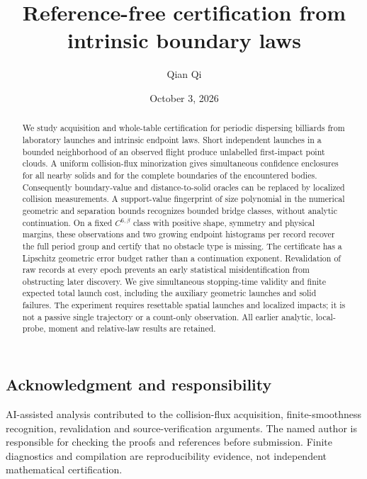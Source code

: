 \documentclass[11pt]{amsart}
\title[Reference-free certification]{Reference-free certification from intrinsic boundary laws}
\author{Qian Qi}\date{October 3, 2026}
\theoremstyle{definition}\newtheorem{definition}[theorem]{Definition}
\theoremstyle{remark}\newtheorem{remark}[theorem]{Remark}
\numberwithin{equation}{section}
\begin{document}
\raggedbottom
\begin{abstract}
We study acquisition and whole-table certification for periodic dispersing
billiards from laboratory launches and intrinsic endpoint laws. Short
independent launches in a bounded neighborhood of an observed flight
produce unlabelled first-impact point clouds. A uniform collision-flux
minorization gives simultaneous confidence enclosures for all nearby
solids and for the complete boundaries of the encountered bodies.
Consequently boundary-value and distance-to-solid oracles can be replaced
by localized collision measurements. A support-value fingerprint of size
polynomial in the numerical geometric and separation bounds recognizes
bounded bridge classes, without analytic continuation. On a fixed
$C^{6,\beta}$ class with positive shape, symmetry and physical margins,
these observations and two growing endpoint histograms per record recover
the full period group and certify that no obstacle type is missing.
The certificate has a Lipschitz geometric error budget rather than a
continuation exponent. Revalidation of raw records at every epoch prevents
an early statistical misidentification from obstructing later discovery.
We give simultaneous stopping-time validity and finite expected total
launch cost, including the auxiliary geometric launches and solid failures.
The experiment requires resettable spatial launches and localized impacts;
it is not a passive single trajectory or a count-only observation.
All earlier analytic, local-probe, moment and relative-law results are retained.
\end{abstract}
\maketitle






\subsection*{Acknowledgment and responsibility}
AI-assisted analysis contributed to the collision-flux acquisition,
finite-smoothness recognition, revalidation and source-verification
arguments. The named author is responsible for checking the proofs and
references before submission. Finite diagnostics and compilation are
reproducibility evidence, not independent mathematical certification.

\end{document}
